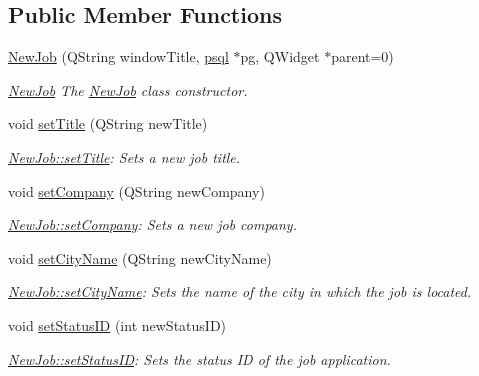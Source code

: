 \subsection*{Public Member Functions}
\begin{DoxyCompactItemize}
\item 
\mbox{\hyperlink{class_new_job_a489279a9ec91bcac74d7dad65eb2f85a}{New\+Job}} (Q\+String window\+Title, \mbox{\hyperlink{classpsql}{psql}} $\ast$pg, Q\+Widget $\ast$parent=0)
\begin{DoxyCompactList}\small\item\em \mbox{\hyperlink{class_new_job}{New\+Job}} The \mbox{\hyperlink{class_new_job}{New\+Job}} class constructor. \end{DoxyCompactList}\item 
void \mbox{\hyperlink{class_new_job_ae8c2b576f2ea6f444776e6d944f0d767}{set\+Title}} (Q\+String new\+Title)
\begin{DoxyCompactList}\small\item\em \mbox{\hyperlink{class_new_job_ae8c2b576f2ea6f444776e6d944f0d767}{New\+Job\+::set\+Title}}\+: Sets a new job title. \end{DoxyCompactList}\item 
void \mbox{\hyperlink{class_new_job_ad9f522f4a6a45348ecc3ab1229b5eabb}{set\+Company}} (Q\+String new\+Company)
\begin{DoxyCompactList}\small\item\em \mbox{\hyperlink{class_new_job_ad9f522f4a6a45348ecc3ab1229b5eabb}{New\+Job\+::set\+Company}}\+: Sets a new job company. \end{DoxyCompactList}\item 
void \mbox{\hyperlink{class_new_job_a66004f3c78c6d9796fc3c5ce66f2479b}{set\+City\+Name}} (Q\+String new\+City\+Name)
\begin{DoxyCompactList}\small\item\em \mbox{\hyperlink{class_new_job_a66004f3c78c6d9796fc3c5ce66f2479b}{New\+Job\+::set\+City\+Name}}\+: Sets the name of the city in which the job is located. \end{DoxyCompactList}\item 
void \mbox{\hyperlink{class_new_job_aa184d2046d0e60e82cd5840c40b99bed}{set\+Status\+ID}} (int new\+Status\+ID)
\begin{DoxyCompactList}\small\item\em \mbox{\hyperlink{class_new_job_aa184d2046d0e60e82cd5840c40b99bed}{New\+Job\+::set\+Status\+ID}}\+: Sets the status ID of the job application. \end{DoxyCompactList}\item 

\end{DoxyCompactItemize}
